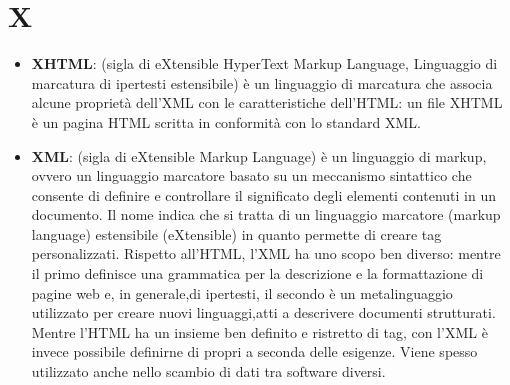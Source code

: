 \section{X}
\begin{itemize} 
	\item
	\textbf{XHTML}: (sigla di eXtensible HyperText Markup Language, Linguaggio di marcatura di ipertesti estensibile) è un linguaggio di marcatura che associa alcune proprietà dell'XML con le caratteristiche dell'HTML: un file XHTML è un pagina HTML scritta in conformità con lo standard XML.
	\item
	\textbf{XML}: (sigla di eXtensible Markup Language) è un linguaggio di markup, ovvero un linguaggio marcatore basato su un meccanismo sintattico che consente di definire e controllare il significato degli elementi contenuti in un documento. Il nome indica che si tratta di un linguaggio marcatore (markup language) estensibile (eXtensible) in quanto permette di creare tag personalizzati. Rispetto all’HTML, l’XML ha uno scopo ben diverso: mentre il primo definisce una grammatica per la descrizione e la formattazione di pagine web e, in generale,di ipertesti, il secondo è un metalinguaggio utilizzato per creare nuovi linguaggi,atti a descrivere documenti strutturati. Mentre l’HTML ha un insieme ben definito e ristretto di tag, con l’XML è invece possibile definirne di propri a seconda delle esigenze. Viene spesso utilizzato anche nello scambio di dati tra software diversi.
\end{itemize}